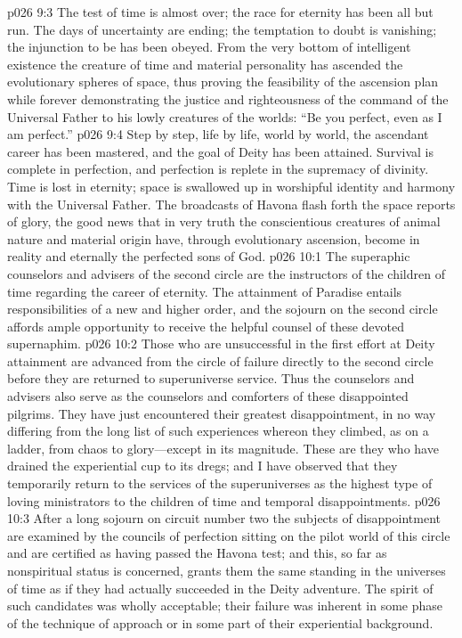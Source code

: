 \pc \vs p026 9:3 The test of time is almost over; the race for eternity has been all but run. The days of uncertainty are ending; the temptation to doubt is vanishing; the injunction to be  has been obeyed. From the very bottom of intelligent existence the creature of time and material personality has ascended the evolutionary spheres of space, thus proving the feasibility of the ascension plan while forever demonstrating the justice and righteousness of the command of the Universal Father to his lowly creatures of the worlds: “Be you perfect, even as I am perfect.”
\vs p026 9:4 Step by step, life by life, world by world, the ascendant career has been mastered, and the goal of Deity has been attained. Survival is complete in perfection, and perfection is replete in the supremacy of divinity. Time is lost in eternity; space is swallowed up in worshipful identity and harmony with the Universal Father. The broadcasts of Havona flash forth the space reports of glory, the good news that in very truth the conscientious creatures of animal nature and material origin have, through evolutionary ascension, become in reality and eternally the perfected sons of God.
\vs p026 10:1 The superaphic counselors and advisers of the second circle are the instructors of the children of time regarding the career of eternity. The attainment of Paradise entails responsibilities of a new and higher order, and the sojourn on the second circle affords ample opportunity to receive the helpful counsel of these devoted supernaphim.
\pc \vs p026 10:2 Those who are unsuccessful in the first effort at Deity attainment are advanced from the circle of failure directly to the second circle before they are returned to superuniverse service. Thus the counselors and advisers also serve as the counselors and comforters of these disappointed pilgrims. They have just encountered their greatest disappointment, in no way differing from the long list of such experiences whereon they climbed, as on a ladder, from chaos to glory---except in its magnitude. These are they who have drained the experiential cup to its dregs; and I have observed that they temporarily return to the services of the superuniverses as the highest type of loving ministrators to the children of time and temporal disappointments.\plusone
\vs p026 10:3 After a long sojourn on circuit number two the subjects of disappointment are examined by the councils of perfection sitting on the pilot world of this circle and are certified as having passed the Havona test; and this, so far as nonspiritual status is concerned, grants them the same standing in the universes of time as if they had actually succeeded in the Deity adventure. The spirit of such candidates was wholly acceptable; their failure was inherent in some phase of the technique of approach or in some part of their experiential background.
